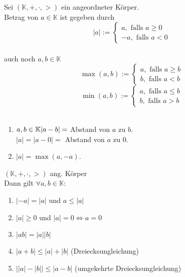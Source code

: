 \documentclass[../ana1.tex]{subfiles}
\begin{document}
\begin{defi}[Betrag]
	Sei \((\mathbb{K}, +,\cdot,>)\) ein angeordneter Körper.\\
	Betrag von \(a\in\mathbb{K}\) ist gegeben durch
	\[|a| :=
		\begin{cases}
			a, \text{ falls } a\geq 0 \\
			-a, \text{ falls }a<0
		\end{cases}\] \\
	auch noch \(a,b\in \mathbb{K}\) \\
	\[\max(a,b) :=
	\begin{cases}
		a, \text{ falls } a\geq b \\
		b, \text{ falls } a < b
	\end{cases}\]
	\[\min(a,b) :=
	\begin{cases}
		a, \text{ falls } a\leq b \\
		b, \text{ falls } a > b
	\end{cases}\] \\
\end{defi}
\begin{bem}\leavevmode
	\begin{enumerate}
		\item \(a,b\in \mathbb{K}\\
			|a-b| = \) Abstand von \(a\) zu \(b\).\\
			\(|a| = |a-0| = \) Abstand von \(a\) zu \(0\).
		\item \(|a| = \max(a, -a)\).
	\end{enumerate}
\end{bem}
\begin{satz}
	\((\mathbb{K},+,\cdot,>)\) ang. Körper\\
	Dann gilt \(\forall a,b\in\mathbb{K}\):
	\begin{enumerate}
		\item \(|-a| = |a|\) und \(a\leq|a|\)
		\item \(|a| \geq 0\) und \(|a| = 0 \Leftrightarrow a = 0\)
		\item \(|ab| = |a| |b|\)
		\item \(|a+b| \leq |a| + |b|\) (Dreiecksungleichung)
		\item \(\left||a|-|b|\right| \leq |a-b|\) (umgekehrte Dreiecksungleichung)
	\end{enumerate}
\end{satz}
\end{document}
